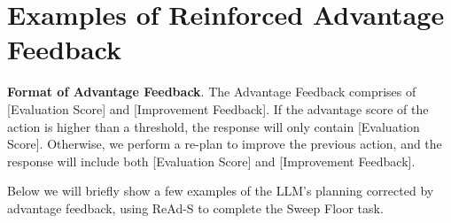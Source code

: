 \documentclass[11pt]{article}
\theoremstyle{plain}
\theoremstyle{remark}
\newcommand{\blank}[1]{\textcolor{brown}{#1}}
\begin{document}
	

\newpage
\section{Examples of Reinforced Advantage Feedback}\label{app:H}

\textbf{Format of Advantage Feedback}. The Advantage Feedback comprises of [Evaluation Score] and [Improvement Feedback]. If the advantage score of the action is higher than a threshold, the response will only contain [Evaluation Score]. Otherwise, we perform a re-plan to improve the previous action, and the response will include both [Evaluation Score] and [Improvement Feedback].

Below we will briefly show a few examples of the LLM's planning corrected by advantage feedback, using ReAd-S to complete the Sweep Floor task.
\end{document}
